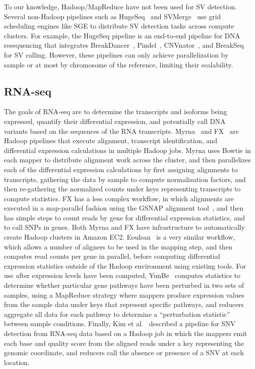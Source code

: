 To our knowledge, Hadoop/MapReduce have not been used for SV detection. Several non-Hadoop pipelines such as HugeSeq~\cite{Lam:2012jy} and SVMerge~\cite{Wong:2010p1271} use grid scheduling engines like SGE to distribute SV detection tasks across compute clusters. For example, the HugeSeq pipeline is an end-to-end pipeline for DNA resequencing that integrates BreakDancer~\cite{Chen:2009p3}, Pindel~\cite{Ye:2009p2}, CNVnator~\cite{Abyzov:2011bk}, and BreakSeq~\cite{Lam:2010p1383} for SV calling. However, these pipelines can only achieve parallelization by sample or at most by chromosome of the reference, limiting their scalability.

\subsection{RNA-seq}

The goals of RNA-seq are to determine the transcripts and isoforms being expressed, quantify their differential expression, and potentially call DNA variants based on the sequences of the RNA transcripts.  Myrna~\cite{Langmead:2010p1268} and FX~\cite{Hong:2012du} are Hadoop pipelines that execute alignment, transcript identification, and differential expression calculations in multiple Hadoop jobs. Myrna uses Bowtie in each mapper to distribute alignment work across the cluster, and then parallelizes each of the differential expression calculations by first assigning alignments to transcripts, gathering the data by sample to compute normalization factors, and then re-gathering the normalized counts under keys representing transcripts to compute statistics. FX has a less complex workflow, in which alignments are executed in a map-parallel fashion using the GSNAP alignment tool~\cite{Wu:2010p875}, and then has simple steps to count reads by gene for differential expression statistics, and to call SNPs in genes. Both Myrna and FX have infrastructure to automatically create Hadoop clusters in Amazon EC2. Eoulsan~\cite{Jourdren:2012dc} is a very similar workflow, which allows a number of aligners to be used in the mapping step, and then computes read counts per gene in parallel, before computing differential expression statistics outside of the Hadoop environment using existing tools. For use after expression levels have been computed, YunBe~\cite{Zhang:2011p1823} computes statistics to determine whether particular gene pathways have been perturbed in two sets of samples, using a MapReduce strategy where mappers produce expression values from the sample data under keys that represent specific pathways, and reducers aggregate all data for each pathway to determine a ``perturbation statistic'' between sample conditions. Finally, Kim et al.~\cite{Kim2011RNASEQ} described a pipeline for SNV detection from RNA-seq data based on a Hadoop job in which the mappers emit each base and quality score from the aligned reads under a key representing the genomic coordinate, and reducers call the absence or presence of a SNV at each location.

